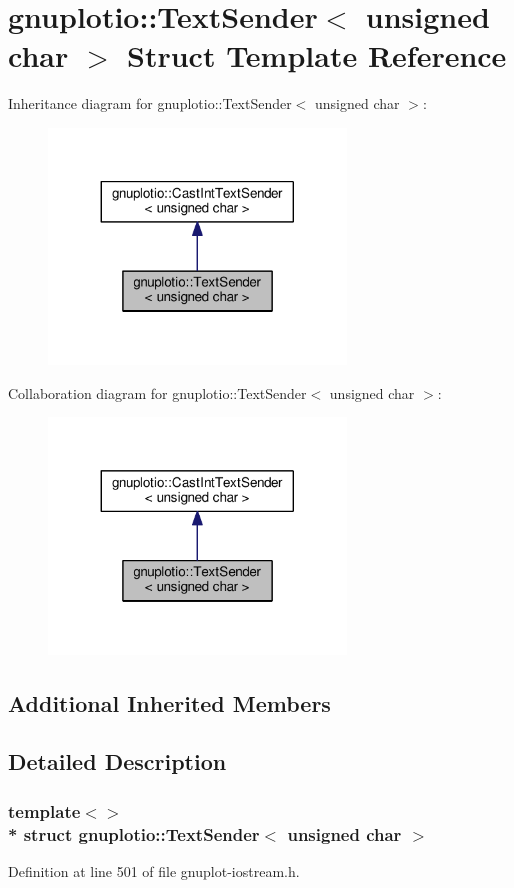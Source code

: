 \hypertarget{structgnuplotio_1_1_text_sender_3_01unsigned_01char_01_4}{}\section{gnuplotio\+:\+:Text\+Sender$<$ unsigned char $>$ Struct Template Reference}
\label{structgnuplotio_1_1_text_sender_3_01unsigned_01char_01_4}


Inheritance diagram for gnuplotio\+:\+:Text\+Sender$<$ unsigned char $>$\+:\nopagebreak
\begin{figure}[H]
\begin{center}
\leavevmode
\includegraphics[width=224pt]{structgnuplotio_1_1_text_sender_3_01unsigned_01char_01_4__inherit__graph}
\end{center}
\end{figure}


Collaboration diagram for gnuplotio\+:\+:Text\+Sender$<$ unsigned char $>$\+:\nopagebreak
\begin{figure}[H]
\begin{center}
\leavevmode
\includegraphics[width=224pt]{structgnuplotio_1_1_text_sender_3_01unsigned_01char_01_4__coll__graph}
\end{center}
\end{figure}
\subsection*{Additional Inherited Members}


\subsection{Detailed Description}
\subsubsection*{template$<$$>$\\*
struct gnuplotio\+::\+Text\+Sender$<$ unsigned char $>$}



Definition at line 501 of file gnuplot-\/iostream.\+h.

